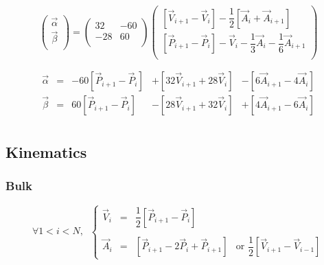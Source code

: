 \documentclass[aps,12pt]{revtex4}
\begin{document}
\begin{equation}
\begin{pmatrix}
\vec{\alpha}\\
\vec{\beta}\\
\end{pmatrix}
=
\begin{pmatrix}
32  & -60 \\
-28 & 60\\
\end{pmatrix}
\begin{pmatrix}
\left[\vec{V}_{i+1}-\vec{V}_{i}\right] - \dfrac{1}{2}\left[\vec{A}_i + \vec{A}_{i+1}\right]\\
\left[\vec{P}_{i+1}-\vec{P}_{i}\right] - \vec{V}_i - \dfrac{1}{3} \vec{A}_i - \dfrac{1}{6} \vec{A}_{i+1}\\
\end{pmatrix}
\end{equation}

\begin{equation}
\begin{array}{rcrrr}
	\vec{\alpha} & = & -60\left[\vec{P}_{i+1}-\vec{P}_i\right] & + \left[32\vec{V}_{i+1} + 28 \vec{V}_i\right] &  - \left[6\vec{A}_{i+1} -4\vec{A}_{i}\right]\\
	\vec{\beta}  & = & 60\left[\vec{P}_{i+1}-\vec{P}_i\right]   & - \left[28\vec{V}_{i+1} + 32 \vec{V}_i\right] & + \left[4\vec{A}_{i+1}-6\vec{A}_{i}\right]\\
\end{array}
\end{equation}

\subsection{Kinematics}

\subsubsection{Bulk}

\begin{equation}
\forall 1 < i < N, \;\;
\left\lbrace
\begin{array}{rcll}
	\vec{V}_i & = & \dfrac{1}{2} \left[ \vec{P}_{i+1} - \vec{P}_i\right] & \\
	\\
	\vec{A}_i & = &  \left[ \vec{P}_{i+1} - 2\vec{P}_i + \vec{P}_{i+1} \right] & \text{or } \dfrac{1}{2}\left[\vec{V}_{i+1}-\vec{V}_{i-1}\right]
\end{array}
\right.
\end{equation}
\end{document}

